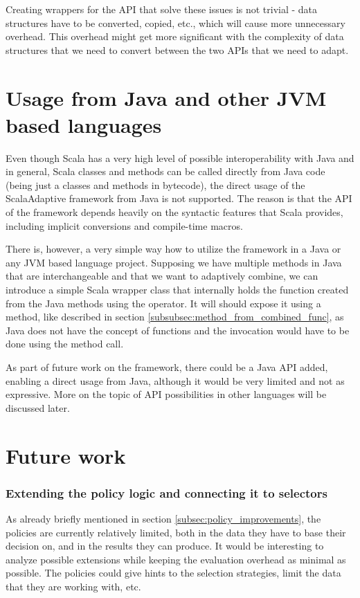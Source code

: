 Creating wrappers for the API that solve these issues is not trivial - data structures have to be converted, copied, etc., which will cause more unnecessary overhead. This overhead might get more significant with the complexity of data structures that we need to convert between the two APIs that we need to adapt.

\section{Usage from Java and other JVM based languages}
\label{sec:usage_from_java}

Even though Scala has a very high level of possible interoperability with Java and in general, Scala classes and methods can be called directly from Java code (being just a classes and methods in bytecode), the direct usage of the ScalaAdaptive framework from Java is not supported. The reason is that the API of the framework depends heavily on the syntactic features that Scala provides, including implicit conversions and compile-time macros.

There is, however, a very simple way how to utilize the framework in a Java or any JVM based language project. Supposing we have multiple methods in Java that are interchangeable and that we want to adaptively combine, we can introduce a simple Scala wrapper class that internally holds the function created from the Java methods using the  operator. It will should expose it using a method, like described in section \ref{subsubsec:method_from_combined_func}, as Java does not have the concept of functions and the invocation would have to be done using the  method call.

As part of future work on the framework, there could be a Java API added, enabling a direct usage from Java, although it would be very limited and not as expressive. More on the topic of API possibilities in other languages will be discussed later.

\section{Future work}

\subsubsection{Extending the policy logic and connecting it to selectors}

As already briefly mentioned in section \ref{subsec:policy_improvements}, the policies are currently relatively limited, both in the data they have to base their decision on, and in the results they can produce. It would be interesting to analyze possible extensions while keeping the evaluation overhead as minimal as possible. The policies could give hints to the selection strategies, limit the data that they are working with, etc.

